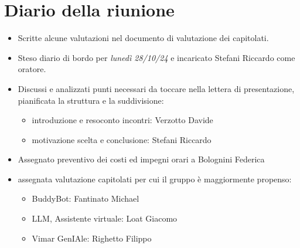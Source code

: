 \section{Diario della riunione}

\begin{itemize}
    \item Scritte alcune valutazioni nel documento di valutazione dei capitolati.
    \item Steso diario di bordo per \emph{lunedì 28/10/24} e incaricato Stefani Riccardo come oratore.
    \item Discussi e analizzati punti necessari da toccare nella lettera di presentazione, pianificata la struttura e la suddivisione:
    \begin{itemize}
        \renewcommand{\labelitemii}{--}
        \item introduzione e resoconto incontri: Verzotto Davide
        \item motivazione scelta e conclusione: Stefani Riccardo
    \end{itemize}
    \item Assegnato preventivo dei costi ed impegni orari a Bolognini Federica
    \item assegnata valutazione capitolati per cui il gruppo è maggiormente propenso:
    \begin{itemize}
        \renewcommand{\labelitemii}{--}
        \item BuddyBot: Fantinato Michael
        \item LLM, Assistente virtuale: Loat Giacomo
        \item Vimar GenIAle: Righetto Filippo
    \end{itemize}
\end{itemize}



